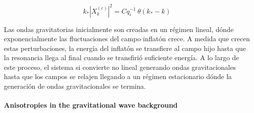 \begin{equation}
    k_* \left| X_k^{(c)} \right|^2 = C q_i^{-1} \ \theta (k_* - k)
\end{equation}

Las ondas gravitatorias inicialmente son creadas en un régimen lineal, dónde exponencialmente las fluctuaciones del campo inflatón crece. A medida que crecen estas perturbaciones, la energía del inflatón se transfiere al campo hijo hasta que la resonancia llega al final cuando se transfirió suficiente energía. A lo largo de este proceso, el sistema si convierte no lineal generando ondas gravitacionales hasta que los campos se relajen llegando a un régimen estacionario dónde la generación de ondas gravitacionales se termina.

\paragraph{Anisotropies in the gravitational wave background}
